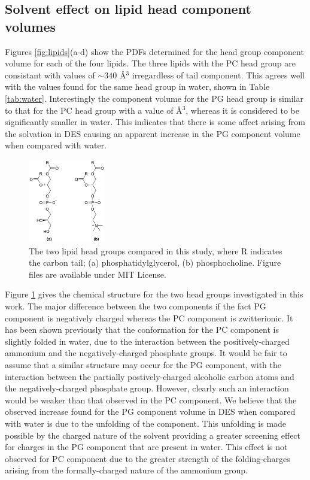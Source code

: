 \documentclass[twoside,twocolumn,9pt]{article}
\begin{document}
\subsection{Solvent effect on lipid head component volumes}
Figures \ref{fig:lipids}(a-d) show the PDFs determined for the head group component volume for each of the four lipids. The three lipids with the PC head group are consistant with values of $\sim340$ \AA$^3$ irregardless of tail component. This agrees well with the values found for the same head group in water, shown in Table \ref{tab:water}. Interestingly the component volume for the PG head group is similar to that for the PC head group with a value of  \AA$^3$, whereas it is considered to be significantly smaller in water. This indicates that there is some affect arising from the solvation in DES causing an apparent increase in the PG component volume when compared with water. 

\begin{figure}
	\centering
	\includegraphics[width=0.30\textwidth]{figures/head_groups}
	\caption{The two lipid head groups compared in this study, where R indicates the carbon tail; (a) phosphatidylglycerol, (b) phosphocholine. Figure files are available under MIT License.\cite{mccluskey_2018}}
	\label{fig:heads}
\end{figure}

Figure \ref{fig:heads} gives the chemical structure for the two head groups investigated in this work. The major difference between the two components if the fact PG component is negatively charged whereas the PC component is zwitterionic. It has been shown previously that the conformation for the PC component is slightly folded in water,\cite{Gilliams2016} due to the interaction between the positively-charged ammonium and the negatively-charged phosphate groups. It would be fair to assume that a similar structure may occur for the PG component, with the interaction between the partially postively-charged alcoholic carbon atoms and the negatively-charged phosphate group. However, clearly such an interaction would be weaker than that observed in the PC component. We believe that the observed increase found for the PG component volume in DES when compared with water is due to the unfolding of the component. This unfolding is made possible by the charged nature of the solvent providing a greater screening effect for charges in the PG component that are present in water. This effect is not observed for PC component due to the greater strength of the folding-charges arising from the formally-charged nature of the ammonium group. 
\end{document}
